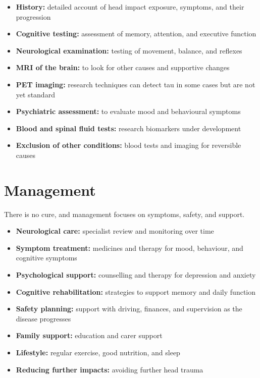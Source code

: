 \begin{itemize}
    \item \textbf{History:} detailed account of head impact exposure, symptoms, and their progression
    \item \textbf{Cognitive testing:} assessment of memory, attention, and executive function
    \item \textbf{Neurological examination:} testing of movement, balance, and reflexes
    \item \textbf{MRI of the brain:} to look for other causes and supportive changes
    \item \textbf{PET imaging:} research techniques can detect tau in some cases but are not yet standard
    \item \textbf{Psychiatric assessment:} to evaluate mood and behavioural symptoms
    \item \textbf{Blood and spinal fluid tests:} research biomarkers under development
    \item \textbf{Exclusion of other conditions:} blood tests and imaging for reversible causes
\end{itemize}

\section*{Management}
There is no cure, and management focuses on symptoms, safety, and support.

\begin{itemize}
    \item \textbf{Neurological care:} specialist review and monitoring over time
    \item \textbf{Symptom treatment:} medicines and therapy for mood, behaviour, and cognitive symptoms
    \item \textbf{Psychological support:} counselling and therapy for depression and anxiety
    \item \textbf{Cognitive rehabilitation:} strategies to support memory and daily function
    \item \textbf{Safety planning:} support with driving, finances, and supervision as the disease progresses
    \item \textbf{Family support:} education and carer support
    \item \textbf{Lifestyle:} regular exercise, good nutrition, and sleep
    \item \textbf{Reducing further impacts:} avoiding further head trauma
\end{itemize}


